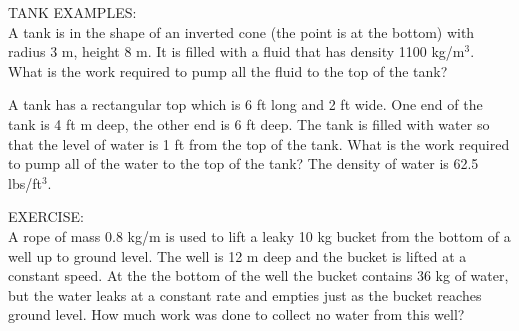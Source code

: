 \documentclass[11pt]{article}
\begin{document}
\pagebreak

TANK EXAMPLES:\\

A tank is in the shape of an inverted cone (the point is at the bottom) with radius 3 m, height 8 m.  It is filled with a fluid that
has density 1100 kg/m$^3$.  What is the work required to pump all the fluid to the top of the tank?\\

\vspace{4in}

A tank has a rectangular top which is 6 ft long and 2 ft wide.  One end of the tank is 4 ft m deep, the other end is 6 ft deep.  The tank
is filled with water so that the level of water is 1 ft from the top of the tank.  What is the work required to pump all of the water to
the top of the tank?  The density of water is 62.5 lbs/ft$^3$.\\

\vspace{4in}

EXERCISE: \\

A rope of mass 0.8 kg/m is used to lift a leaky 10 kg bucket from the bottom of a well up to ground level.  The well is 12 m
deep and the bucket is lifted at a constant speed.  At the the bottom of the well the bucket contains 36 kg of water, but the water leaks
at a constant rate and empties just as the bucket reaches ground level.  How much work was done to collect no water from this well?
\end{document}
